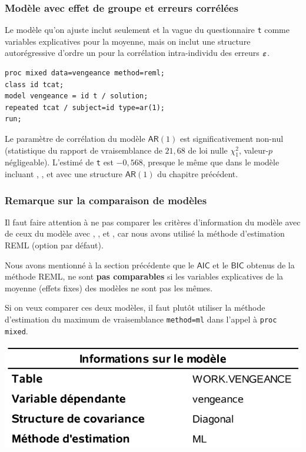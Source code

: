\documentclass{beamer}
\begin{document}
\begin{frame}[fragile]
\frametitle{Modèle avec effet de groupe et erreurs corrélées}
Le modèle qu'on ajuste inclut seulement  et la vague du questionnaire \texttt{t} comme variables explicatives pour la moyenne, mais on inclut une structure autorégressive d'ordre un pour la corrélation intra-individu des erreurs $\boldsymbol {\varepsilon}$.

\begin{tcolorbox}[colback=white, colframe=hecblue, title=Code \SASlang pour un modèle avec effet groupe et corrélation $\mathsf{AR}(1)$]
\begin{verbatim}
proc mixed data=vengeance method=reml; 
class id tcat; 
model vengeance = id t / solution; 
repeated tcat / subject=id type=ar(1); 
run;
\end{verbatim}
\end{tcolorbox}
{\footnotesize Le paramètre de corrélation du modèle $\mathsf{AR}(1)$ est significativement non-nul (statistique du rapport de vraisemblance de $21,68$ de loi nulle  $\chi^2_1$, valeur-$p$ négligeable). L'estimé de \texttt{t} est $-0,568$, presque le même que dans le modèle incluant , ,  et  avec une structure  $\mathsf{AR}(1)$ du chapitre précédent. 

}
\end{frame}

\begin{frame}[fragile]
\frametitle{Remarque sur la comparaison de modèles}
\bi
\item Il faut faire attention à \alert{ne pas comparer} les critères d'information du modèle avec  de ceux du modèle avec , ,  et , car nous avons utilisé la méthode d'estimation REML (option par défaut). 
\item Nous avons mentionné à la section précédente que le $\mathsf{AIC}$ et le $\mathsf{BIC}$ obtenus de la méthode REML, ne sont \textbf{pas comparables} si les variables explicatives de la moyenne (effets fixes) des modèles ne sont pas les mêmes. 
\item Si on veux comparer ces deux modèles, il faut plutôt utiliser la méthode d'estimation du maximum de vraisemblance \texttt{method=ml} dans l'appel à \texttt{proc mixed}.
\ei
 \begin{center}
  \includegraphics[width = 0.5\linewidth]{img/c6/diapos7-e05}
 \end{center}
   
\end{frame}
\end{document}
